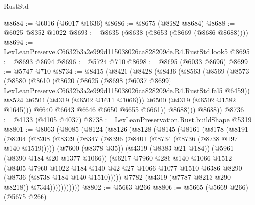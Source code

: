 \begin{lexlean}{RustStd}
\begin{coremodule}
@8684 := @6016 (@6017 @1636)
@8686 := @8675 (@8682 @8684)
@8688 := @6025 @8352 @1022
@8693 := @8635 (@8638 (@8653 (@8669 (@8686 @8688))))
@8694 := LexLeanPreserve.C6632b3a2e999d115038026ca828209de.R4.RustStd.look5
@8695 := @8693 @8694
@8696 := @5724 @710
@8698 := @8695 (@6033 @8696)
@8699 := @5747 @710
@8734 := @8415
    (@8420
      (@8428
        (@8436
          (@8563
            (@8569
              (@8573
                (@8580
                  (@8610
                    (@8620
                      (@8625
                        (@8698
                          (@6037 @8699)
                          LexLeanPreserve.C6632b3a2e999d115038026ca828209de.R4.RustStd.fal5
                          @6459))
                      @8524
                      @6500
                      (@4319 (@6502 @1611 @1066)))
                    @6500
                    (@4319 (@6502 @1582 @1645)))
                  @6640
                  @6643
                  @6646
                  @6650
                  @6655
                  @6661))
              @8688)))
        @8688))
@8736 := @4133 (@4105 @4037)
@8738 := LexLeanPreservation.Rust.buildShape @5319
@8801 := @8063
    (@8085
      (@8124
        (@8126
          (@8128
            (@8145
              (@8161
                (@8178
                  (@8191
                    (@8204
                      (@8208
                        (@8329
                          (@8347
                            (@8396 (@8401 (@8734 (@8736 (@8738 @197 @140 @1519)))))
                            (@7600 (@8378 @35))
                            (@4319 (@8383 @21 @184))
                            (@5961 (@8390 @184 @20 @1377 @1066))
                            (@6207
                              @7960
                              @286
                              @140
                              @1066
                              @1512
                              (@8405
                                @7960
                                @1022
                                @184
                                @140
                                @42
                                @27
                                @1066
                                @1077
                                @1510
                                @6386
                                @8290
                                (@8736 (@8738 @184 @140 @1510)))))
                          @7782
                          (@4319 (@7787 @8213 @290 @8218))
                          @7344)))))))))))
@8802 := @5663 @266
@8806 := @5665 (@5669 @266) (@5675 @266)

\end{coremodule}
\end{lexlean}
